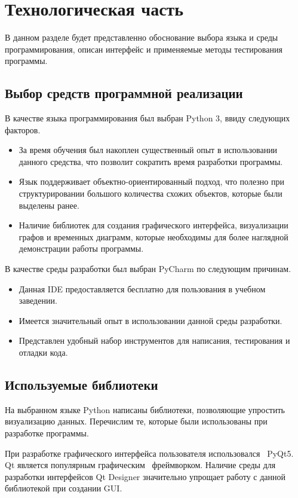 \section{Технологическая часть}

В данном разделе будет представленно обоснование выбора языка и среды программирования, описан интерфейс и применяемые методы тестирования программы.

\subsection{Выбор средств программной реализации}
В качестве языка программирования был выбран Python 3, ввиду следующих факторов.

\begin{itemize}
	\item За время обучения был накоплен существенный опыт в использовании данного средства, что позволит сократить время разработки программы.
	\item Язык поддерживает объектно-ориентированный подход, что полезно при структурировании большого количества схожих объектов, которые были выделены ранее.
	\item Наличие библиотек для создания графического интерфейса, визуализации графов и временных диаграмм, которые необходимы для более наглядной демонстрации работы программы.
\end{itemize}
\qquad
В качестве среды разработки был выбран PyCharm по следующим причинам.
\begin{itemize}
	\item Данная IDE предоставляется бесплатно для пользования в учебном \, заведении\cite{tech:pycharm}.
	\item Имеется значительный опыт в использовании данной среды разработки.
	\item Представлен удобный набор инструментов для написания, тестирования и отладки кода.
\end{itemize}

\subsection{Используемые библиотеки}
На выбранном языке Python написаны библиотеки, позволяющие упростить визуализацию данных. Перечислим те, которые были использованы при разработке программы.

При разработке графического интерфейса пользователя использовался \, PyQt5. Qt является популярным графическим \, фреймворком\cite{libs:pyqt}. Наличие среды для разработки интерфейсов Qt Designer значительно упрощает работу с данной библиотекой при создании GUI.

